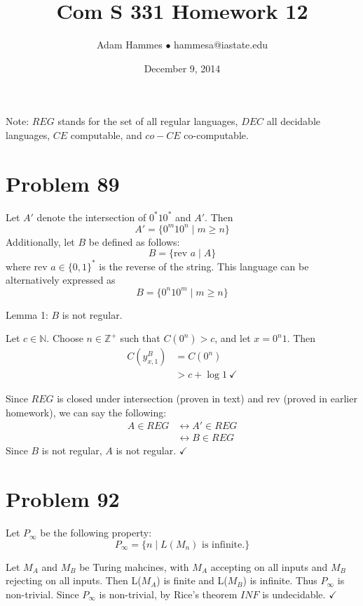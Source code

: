 \documentclass[11pt]{article}
\let\iff\leftrightarrow
\begin{document}
\title{Com S 331 Homework 12}
\author{Adam Hammes $\bullet$ hammesa@iastate.edu}
\date{December 9, 2014}
\maketitle

Note: $REG$ stands for the set of all regular languages, $DEC$ all decidable languages, $CE$ computable, and $co-CE$ co-computable.


\section*{Problem 89}

Let $A'$ denote the intersection of $0^*10^*$ and $A'$.
Then
	\[A' = \{0^m10^n \mid  m \geq n \}\]
Additionally, let $B$ be defined as follows:
	\[B = \{ \text{rev } a \mid A \} \]
where rev $a \in \{0,1\}^*$ is the reverse of the string.
This language can be alternatively expressed as
	\[ B = \{0^n10^m \mid m \geq n\}\]

Lemma 1: $B$ is not regular.

Let $c \in \mathbb{N}$.
Choose $n \in \mathbb{Z}^+$ such that $C(0^n) > c$, and let $x = 0^n1$.
Then
	\begin{align*}
		C( y^{B} _{x,1} ) &= C( 0^n) \\
		&> c + \log 1\ \checkmark
	\end{align*}

Since $REG$ is closed under intersection (proven in text) and rev (proved in earlier homework), we can say the following:
	\begin{align*}
		A \in REG &\iff A' \in REG \\
		&\iff B \in REG
	\end{align*}
Since $B$ is not regular, $A$ is not regular. $\checkmark$
 

\section*{Problem 92}

Let $P_\infty$ be the following property:
	\[ P_\infty = \{ n \mid L(M_n) \text{ is infinite}. \}\] 

Let $M_A$ and $M_B$ be Turing mahcines, with $M_A$ accepting on all inputs and $M_B$ rejecting on all inputs.
Then L($M_A$) is finite and L($M_B$) is infinite. 
Thus $P_\infty$ is non-trivial.
Since $P_\infty$ is non-trivial, by Rice's theorem $INF$ is undecidable. $\checkmark$
\end{document}
